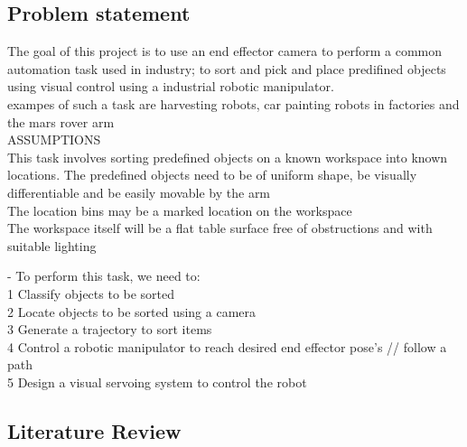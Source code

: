 \documentclass{UoNMCHA}
\numberwithin{equation}{section}
\begin{document}
    
    
    
    \subsection{Problem statement}
    
   The goal of this project is to use an end effector camera to perform a common automation task used in industry; to sort and pick and place predifined objects using visual control using a industrial robotic manipulator. \\
   
   exampes of such a task are harvesting robots, car painting robots in factories and the mars rover arm\\
       
    ASSUMPTIONS\\
    This task involves sorting predefined objects on a known workspace into known locations. The predefined objects need to be of uniform shape, be visually differentiable and be easily movable by the arm \\
    The location bins may be a marked location on the workspace\\
    The workspace itself will be a flat table surface free of obstructions and with suitable lighting 
    
    
    
    - To perform this task, we need to:\\
    	1 Classify objects to be sorted\\
    	2 Locate objects to be sorted using a camera\\
    	3 Generate a trajectory to sort items\\
    	4 Control a robotic manipulator to reach desired end effector pose's // follow a path\\
    	5 Design a visual servoing system to control the robot  
    	
  	
    \subsection{Literature Review}
    
\end{document}
